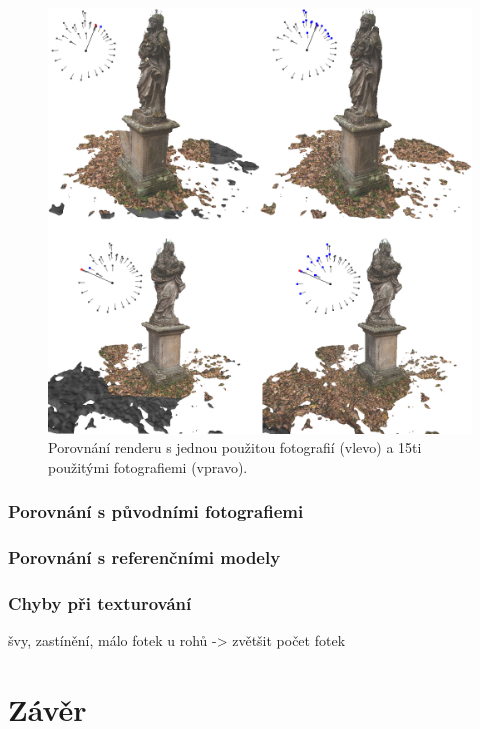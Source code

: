 \documentclass[11pt,twoside,a4paper]{book}
\begin{document}
\begin{figure}[h!]
\begin{center}
\includegraphics[width=\textwidth]{figures/test-4}
\caption{Porovnání renderu s jednou použitou fotografií (vlevo) a 15ti použitými fotografiemi (vpravo).}
\label{fig:test-4}
\end{center}
\end{figure}

\subsection{Porovnání s původními fotografiemi}

\subsection{Porovnání s referenčními modely}


\subsection{Chyby při texturování}
švy, zastínění, málo fotek u rohů -> zvětšit počet fotek

\chapter{Závěr}
\label{chap:end}
\end{document}
